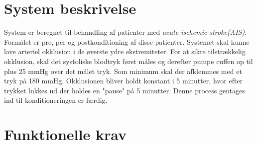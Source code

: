 \documentclass[11pt]{article}
\begin{document}
	\section{System beskrivelse}
	System er beregnet til behandling af patienter med \textit{acute ischemic stroke(AIS)}. Formålet er pre, per og postkonditioning af disse patienter. Systemet skal kunne lave arteriel okklusion i de øverste ydre ekstremiteter. For at sikre tilstrækkelig okklusion, skal det systoliske blodtryk først måles og derefter pumpe cuffen op til plus 25 mmHg over det målet tryk. Som minimum skal der afklemmes med et tryk på 180 mmHg. Okklusionen bliver holdt konstant i 5 minutter, hvor efter trykket lukkes ud der holdes en "pause" på 5 minutter. Denne process gentages ind til konditioneringen er færdig. 

	\section{Funktionelle krav}
	
	
	
	
	
	
	
	
	
	
	
	
	
\end{document}

